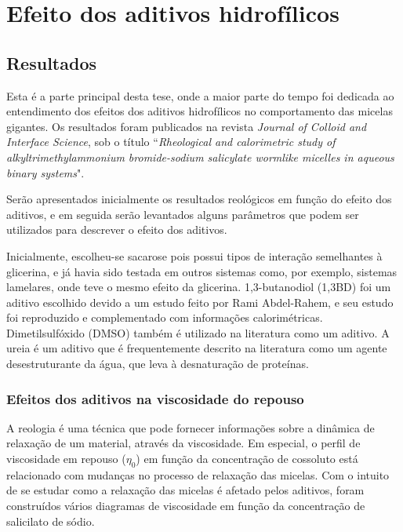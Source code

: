 \part{Efeito dos aditivos hidrofílicos}
	\label{sec:efeito_aditivos_hidrofilicos} 


	
	\chapter{Resultados}
		
	Esta é a parte principal desta tese, onde a maior parte do tempo foi dedicada ao entendimento dos efeitos dos aditivos hidrofílicos no comportamento das micelas gigantes. Os resultados foram publicados na revista \emph{Journal of Colloid and Interface Science}, sob o título ``\emph{Rheological and calorimetric study of alkyltrimethylammonium bromide-sodium salicylate wormlike micelles in aqueous binary systems}".
	
	Serão apresentados inicialmente os resultados reológicos em função do efeito dos aditivos, e em seguida serão levantados alguns parâmetros que podem ser utilizados para descrever o efeito dos aditivos.
	
	Inicialmente, escolheu-se sacarose pois possui tipos de interação semelhantes à glicerina, e já havia sido testada em outros sistemas como, por exemplo, sistemas lamelares, onde teve o mesmo efeito da glicerina. 1,3-butanodiol (1,3BD) foi um aditivo escolhido devido a um estudo feito por Rami Abdel-Rahem, e seu estudo foi reproduzido e complementado com informações calorimétricas. Dimetilsulfóxido (DMSO) também é utilizado na literatura como um aditivo. A ureia é um aditivo que é frequentemente descrito na literatura como um agente desestruturante da água, que leva à desnaturação de proteínas. 	%
	
		\section{Efeitos dos aditivos na viscosidade do repouso} 
			
			A reologia é uma técnica que pode fornecer informações sobre a dinâmica de relaxação de um material, através da viscosidade. Em especial, o perfil de viscosidade em repouso (\(\eta_0\)) em função da concentração de cossoluto está relacionado com mudanças no processo de relaxação das micelas. Com o intuito de se estudar como a relaxação das micelas é afetado pelos aditivos, foram construídos vários diagramas de viscosidade em função da concentração de salicilato de sódio.
			

